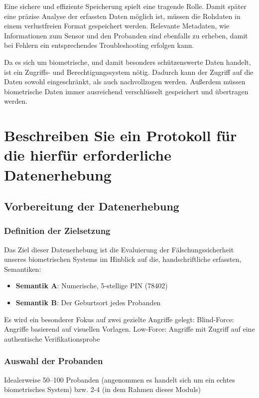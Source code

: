 \documentclass{article}
\begin{document}
Eine sichere und effiziente Speicherung spielt eine tragende Rolle. Damit später eine präzise Analyse der 
erfassten Daten möglich ist, müssen die Rohdaten in einem verlustfreien Format gespeichert werden. 
Relevante Metadaten, wie Informationen zum Sensor und den Probanden sind ebenfalls zu erheben, damit bei 
Fehlern ein entsprechendes Troubleshooting erfolgen kann.

Da es sich um biometrische, und damit besonders schützenswerte Daten handelt, ist ein Zugriffs- und 
Berechtigungssystem nötig. Dadurch kann der Zugriff auf die Daten sowohl eingeschränkt, als auch 
nachvollzogen werden. Außerdem müssen biometrische Daten immer ausreichend verschlüsselt gespeichert und 
übertragen werden.

\section{Beschreiben Sie ein Protokoll für die hierfür erforderliche Datenerhebung}

\subsection{Vorbereitung der Datenerhebung}

\subsubsection{Definition der Zielsetzung}

Das Ziel dieser Datenerhebung ist die Evaluierung der Fälschungssicherheit unseres biometrischen Systems 
im Hinblick auf die, handschriftliche erfassten, Semantiken:

\begin{itemize}
	\item \textbf{Semantik A}: Numerische, 5-stellige PIN (78402)
	\item \textbf{Semantik B}: Der Geburtsort jedes Probanden
\end{itemize}

Es wird ein besonderer Fokus auf zwei gezielte Angriffe gelegt:
Blind-Force: Angriffe basierend auf visuellen Vorlagen.
Low-Force: Angriffe mit Zugriff auf eine authentische Verifikationsprobe

\subsubsection{Auswahl der Probanden}

Idealerweise 50–100 Probanden (angenommen es handelt sich um ein echtes biometrisches System) bzw. 2-4 (in 
dem Rahmen dieses Moduls)
\end{document}
